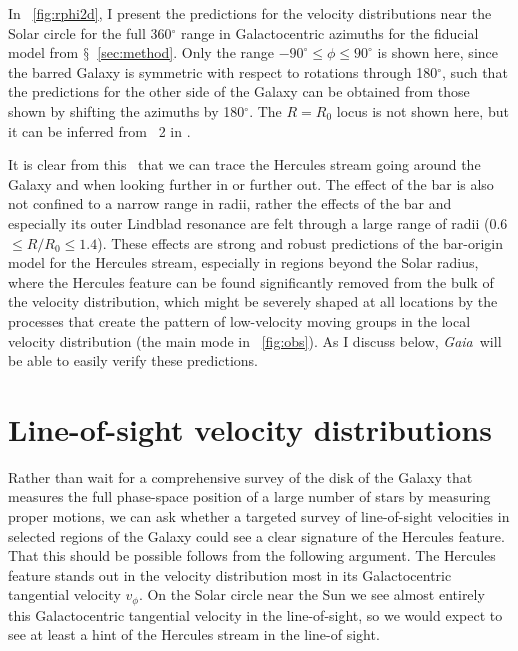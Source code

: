 \documentclass[12pt,preprint]{aastex}
\newcommand{\sectionname}{$\mathsection$}
\newcommand{\Gaia}{\emph{Gaia}}
\newcommand{\vphi}{\ensuremath{v_{\phi}}}
\newcommand{\Ro}{\ensuremath{R_0}}
\begin{document}
In \figurename~\ref{fig:rphi2d}, I present the predictions for the
velocity distributions near the Solar circle for the full
360$^{\circ}$ range in Galactocentric azimuths for the fiducial model
from \sectionname~\ref{sec:method}. Only the range
$-90^{\circ} \leq \phi \leq 90^{\circ}$ is shown here, since the
barred Galaxy is symmetric with respect to rotations through
180$^{\circ}$, such that the predictions for the other side of the
Galaxy can be obtained from those shown by shifting the azimuths by
180$^{\circ}$. The $R = \Ro$ locus is not shown here, but it can be
inferred from \figurename~2 in \citet{dehnen00a}.

It is clear from this \figurename\ that we can trace the Hercules
stream going around the Galaxy and when looking further in or further
out. The effect of the bar is also not confined to a narrow range in
radii, rather the effects of the bar and especially its outer Lindblad
resonance are felt through a large range of radii (0.6 $\leq R/\Ro \leq
1.4$). These effects are strong and robust predictions of the
bar-origin model for the Hercules stream, especially in regions beyond
the Solar radius, where the Hercules feature can be found
significantly removed from the bulk of the velocity distribution,
which might be severely shaped at all locations by the processes that
create the pattern of low-velocity moving groups in the local velocity
distribution (the main mode in \figurename~\ref{fig:obs}). As I
discuss below, \Gaia\ will be able to easily verify these predictions.




\section{Line-of-sight velocity distributions}

Rather than wait for a comprehensive survey of the disk of the Galaxy
that measures the full phase-space position of a large number of stars
by measuring proper motions, we can ask whether a targeted survey of
line-of-sight velocities in selected regions of the Galaxy could see a
clear signature of the Hercules feature. That this should be possible
follows from the following argument. The Hercules feature stands out
in the velocity distribution most in its Galactocentric tangential
velocity $\vphi$. On the Solar circle near the Sun we see almost
entirely this Galactocentric tangential velocity in the line-of-sight,
so we would expect to see at least a hint of the Hercules stream in
the line-of sight.
\end{document}
